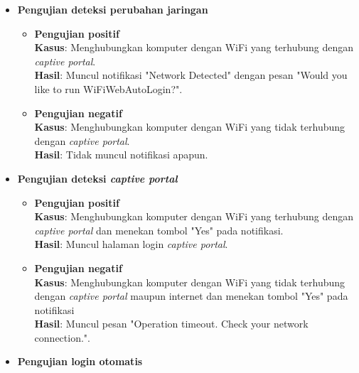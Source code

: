 \begin{itemize}
    \item{
        \textbf{Pengujian deteksi perubahan jaringan}
        
        \begin{itemize}
            \item{
                \textbf{Pengujian positif}\\
                \textbf{Kasus}: Menghubungkan komputer dengan WiFi yang terhubung dengan \textit{captive portal}.\\
                \textbf{Hasil}: Muncul notifikasi "Network Detected" dengan pesan "Would you like to run WiFiWebAutoLogin?".
            }
            \item{
                \textbf{Pengujian negatif}\\
                \textbf{Kasus}: Menghubungkan komputer dengan WiFi yang tidak terhubung dengan \textit{captive portal}.\\
                \textbf{Hasil}: Tidak muncul notifikasi apapun.
            }
        \end{itemize}
    }
    \item{
        \textbf{Pengujian deteksi \textit{captive portal}}
        
        \begin{itemize}
            \item{
                \textbf{Pengujian positif}\\
                \textbf{Kasus}: Menghubungkan komputer dengan WiFi yang terhubung dengan \textit{captive portal} dan menekan tombol "Yes" pada notifikasi.\\
                \textbf{Hasil}: Muncul halaman login \textit{captive portal}.
            }
            \item{
                \textbf{Pengujian negatif}\\
                \textbf{Kasus}: Menghubungkan komputer dengan WiFi yang tidak terhubung dengan \textit{captive portal} maupun internet dan menekan tombol "Yes" pada notifikasi\\
                \textbf{Hasil}: Muncul pesan "Operation timeout. Check your network connection.".
            }
        \end{itemize}
    }
    \item{
        \textbf{Pengujian login otomatis}
        
}
\end{itemize}
